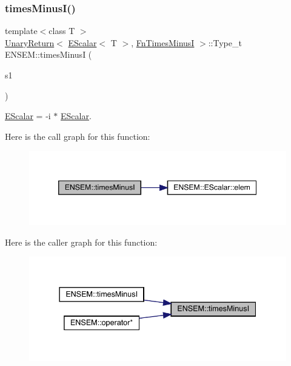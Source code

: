 \subsubsection{\texorpdfstring{timesMinusI()}{timesMinusI()}}
{\footnotesize\ttfamily template$<$class T $>$ \\
\mbox{\hyperlink{structENSEM_1_1UnaryReturn}{Unary\+Return}}$<$ \mbox{\hyperlink{classENSEM_1_1EScalar}{E\+Scalar}}$<$ T $>$, \mbox{\hyperlink{structENSEM_1_1FnTimesMinusI}{Fn\+Times\+MinusI}} $>$\+::Type\+\_\+t E\+N\+S\+E\+M\+::times\+MinusI (\begin{DoxyParamCaption}\item[{const \mbox{\hyperlink{classENSEM_1_1EScalar}{E\+Scalar}}$<$ T $>$ \&}]{s1 }\end{DoxyParamCaption})\hspace{0.3cm}{\ttfamily [inline]}}



\mbox{\hyperlink{classENSEM_1_1EScalar}{E\+Scalar}} = -\/i $\ast$ \mbox{\hyperlink{classENSEM_1_1EScalar}{E\+Scalar}}. 

Here is the call graph for this function\+:
\nopagebreak
\begin{figure}[H]
\begin{center}
\leavevmode
\includegraphics[width=346pt]{d4/dca/group__escalar_gaf2675acd80a7a861cff22098e403837a_cgraph}
\end{center}
\end{figure}
Here is the caller graph for this function\+:
\nopagebreak
\begin{figure}[H]
\begin{center}
\leavevmode
\includegraphics[width=337pt]{d4/dca/group__escalar_gaf2675acd80a7a861cff22098e403837a_icgraph}
\end{center}
\end{figure}
\mbox{\label{group__escalar_ga67754bbbfd7795820548f6c6bb9c6b19}} 
